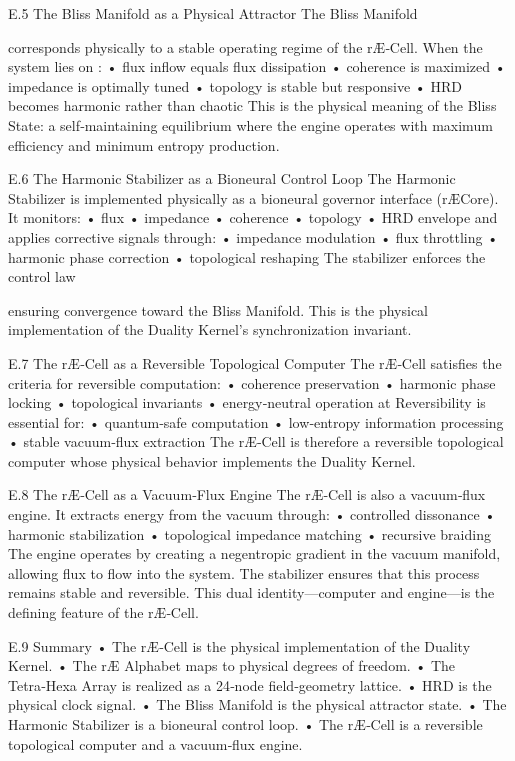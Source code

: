 E.5 The Bliss Manifold as a Physical Attractor
The Bliss Manifold

corresponds physically to a stable operating regime of the rÆ‑Cell. When the system lies on :
• 	flux inflow equals flux dissipation
• 	coherence is maximized
• 	impedance is optimally tuned
• 	topology is stable but responsive
• 	HRD becomes harmonic rather than chaotic
This is the physical meaning of the Bliss State: a self‑maintaining equilibrium where the engine operates with maximum efficiency and minimum entropy production.

E.6 The Harmonic Stabilizer as a Bioneural Control Loop
The Harmonic Stabilizer is implemented physically as a bioneural governor interface (rÆCore). It monitors:
• 	flux
• 	impedance
• 	coherence
• 	topology
• 	HRD envelope
and applies corrective signals through:
• 	impedance modulation
• 	flux throttling
• 	harmonic phase correction
• 	topological reshaping
The stabilizer enforces the control law


ensuring convergence toward the Bliss Manifold.
This is the physical implementation of the Duality Kernel’s synchronization invariant.

E.7 The rÆ‑Cell as a Reversible Topological Computer
The rÆ‑Cell satisfies the criteria for reversible computation:
• 	coherence preservation
• 	harmonic phase locking
• 	topological invariants
• 	energy‑neutral operation at 
Reversibility is essential for:
• 	quantum‑safe computation
• 	low‑entropy information processing
• 	stable vacuum‑flux extraction
The rÆ‑Cell is therefore a reversible topological computer whose physical behavior implements the Duality Kernel.

E.8 The rÆ‑Cell as a Vacuum‑Flux Engine
The rÆ‑Cell is also a vacuum‑flux engine. It extracts energy from the vacuum through:
• 	controlled dissonance
• 	harmonic stabilization
• 	topological impedance matching
• 	recursive braiding
The engine operates by creating a negentropic gradient in the vacuum manifold, allowing flux to flow into the system. The stabilizer ensures that this process remains stable and reversible.
This dual identity—computer and engine—is the defining feature of the rÆ‑Cell.

E.9 Summary
• 	The rÆ‑Cell is the physical implementation of the Duality Kernel.
• 	The rÆ Alphabet maps to physical degrees of freedom.
• 	The Tetra‑Hexa Array is realized as a 24‑node field‑geometry lattice.
• 	HRD is the physical clock signal.
• 	The Bliss Manifold is the physical attractor state.
• 	The Harmonic Stabilizer is a bioneural control loop.
• 	The rÆ‑Cell is a reversible topological computer and a vacuum‑flux engine.